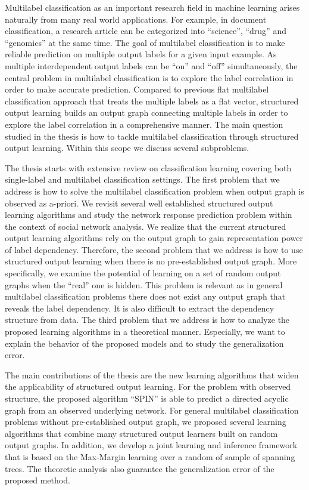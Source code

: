 \documentclass[10pt]{article}
\begin{document}
\setlength{\parindent}{3mm}
\small

\noindent Multilabel classification as an important research field in machine learning arises naturally from many real world applications. For example, in document classification, a research article can be categorized into “science”, “drug” and “genomics” at the same time. The goal of multilabel classification is to make reliable prediction on multiple output labels for a given input example. As multiple interdependent output labels can be “on” and “off” simultaneously, the central problem in multilabel classification is to explore the label correlation in order to make accurate prediction. Compared to previous flat multilabel classification approach that treats the multiple labels as a flat vector, structured output learning builds an output graph connecting multiple labels in order to explore the label correlation in a comprehensive manner. The main question studied in the thesis is how to tackle multilabel classification through structured output learning. Within this scope we discuss several subproblems.

The thesis starts with extensive review on classification learning covering both single-label and multilabel classification settings. The first problem that we address is how to solve the multilabel classification problem when output graph is observed as a-priori. We revisit several well established structured output learning algorithms and study the network response prediction problem within the context of social network analysis. We realize that the current structured output learning algorithms rely on the output graph to gain representation power of label dependency. Therefore, the second problem that we address is how to use structured output learning when there is no pre-established output graph. More specifically, we examine the potential of learning on a set of random output graphs when the “real” one is hidden. This problem is relevant as in general multilabel classification problems there does not exist any output graph that reveals the label dependency. It is also difficult to extract the dependency structure from data. The third problem that we address is how to analyze the proposed learning algorithms in a theoretical manner. Especially, we want to explain the behavior of the proposed models and to study the generalization error.

The main contributions of the thesis are the new learning algorithms that widen the applicability of structured output learning. For the problem with observed structure, the proposed algorithm “SPIN” is able to predict a directed acyclic graph from an observed underlying network. For general multilabel classification problems without pre-established output graph, we proposed several learning algorithms that combine many structured output learners built on random output graphs. In addition, we develop a joint learning and inference framework that is based on the Max-Margin learning over a random of sample of spanning trees. The theoretic analysis also guarantee the generalization error of the proposed method.
\end{document}
